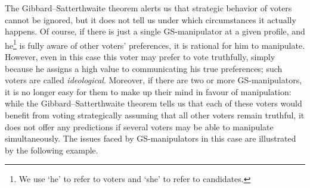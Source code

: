 \documentclass[11pt]{article}
\begin{document}
The Gibbard--Satterthwaite theorem alerts us that strategic behavior of voters cannot be ignored, 
but it does not tell us under which circumstances it actually happens. Of course, if there is just a 
single GS-manipulator at a given profile, and he\footnote{We use `he' to refer to voters and `she' to refer to candidates.}
is fully aware of other voters' preferences, it is rational for him to manipulate. 
However, even in this case this voter may prefer to vote truthfully, simply because 
he assigns a high value to communicating his true preferences; such voters are called {\em ideological}.
Moreover, if there are two or more GS-manipulators, it is no longer easy for them to make up their
mind in favour of manipulation: while the Gibbard--Satterthwaite
theorem tells us that each of these voters would benefit from voting strategically 
assuming that all other voters remain truthful, it does not offer any predictions if
several voters may be able to manipulate simultaneously. 
The issues faced by GS-manipulators in this case are illustrated by the following example.
\end{document}

